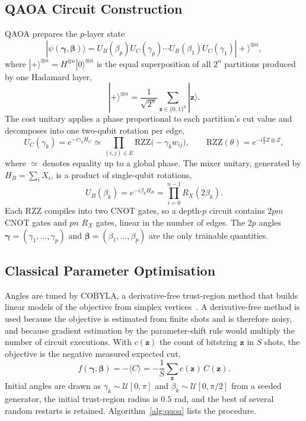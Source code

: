 \documentclass[pdflatex,sn-mathphys-num]{sn-jnl}
\theoremstyle{thmstyleone}
\theoremstyle{thmstyletwo}
\theoremstyle{thmstylethree}
\begin{document}
\subsection{QAOA Circuit Construction}\label{sec:circuit}

QAOA prepares the $p$-layer state
\begin{equation}
  |\psi(\boldsymbol{\gamma},\boldsymbol{\beta})\rangle = U_B(\beta_p)U_C(\gamma_p)\cdots U_B(\beta_1)U_C(\gamma_1)|{+}\rangle^{\otimes n},
  \label{eq:qaoa_state}
\end{equation}
where $|{+}\rangle^{\otimes n}=H^{\otimes n}|0\rangle^{\otimes n}$ is the equal superposition of all $2^n$ partitions produced by one Hadamard layer,
\begin{equation}
  |{+}\rangle^{\otimes n} = \frac{1}{\sqrt{2^n}}\sum_{\mathbf{z}\in\{0,1\}^n}|\mathbf{z}\rangle .
  \label{eq:init}
\end{equation}
The cost unitary applies a phase proportional to each partition's cut value and decomposes into one two-qubit rotation per edge,
\begin{equation}
  U_C(\gamma_k) = e^{-i\gamma_k H_C} \simeq \prod_{(i,j)\in E}\mathrm{RZZ}\bigl(-\gamma_k w_{ij}\bigr),
  \qquad \mathrm{RZZ}(\theta)=e^{-i\frac{\theta}{2}Z\otimes Z},
  \label{eq:uc}
\end{equation}
where $\simeq$ denotes equality up to a global phase. The mixer unitary, generated by $H_B=\sum_i X_i$, is a product of single-qubit rotations,
\begin{equation}
  U_B(\beta_k) = e^{-i\beta_k H_B} = \prod_{i=0}^{n-1} R_X(2\beta_k).
  \label{eq:ub}
\end{equation}
Each $\mathrm{RZZ}$ compiles into two CNOT gates, so a depth-$p$ circuit contains $2pm$ CNOT gates and $pn$ $R_X$ gates, linear in the number of edges. The $2p$ angles $\boldsymbol{\gamma}=(\gamma_1,\ldots,\gamma_p)$ and $\boldsymbol{\beta}=(\beta_1,\ldots,\beta_p)$ are the only trainable quantities.

\subsection{Classical Parameter Optimisation}\label{sec:cobyla}

Angles are tuned by COBYLA, a derivative-free trust-region method that builds linear models of the objective from simplex vertices~\cite{powell1994direct}. A derivative-free method is used because the objective is estimated from finite shots and is therefore noisy, and because gradient estimation by the parameter-shift rule would multiply the number of circuit executions. With $c(\mathbf{z})$ the count of bitstring $\mathbf{z}$ in $S$ shots, the objective is the negative measured expected cut,
\begin{equation}
  f(\boldsymbol{\gamma},\boldsymbol{\beta}) = -\langle C\rangle = -\frac{1}{S}\sum_{\mathbf{z}} c(\mathbf{z})\,C(\mathbf{z}).
  \label{eq:cobyla_obj}
\end{equation}
Initial angles are drawn as $\gamma_k\sim\mathcal{U}[0,\pi]$ and $\beta_k\sim\mathcal{U}[0,\pi/2]$ from a seeded generator, the initial trust-region radius is $0.5$ rad, and the best of several random restarts is retained. Algorithm~\ref{alg:qaoa} lists the procedure.
\end{document}
